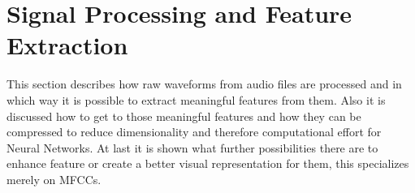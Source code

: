 
\section{Signal Processing and Feature Extraction}\label{sec:features}
This section describes how raw waveforms from audio files are processed and in which way it is possible to extract meaningful features from them.
Also it is discussed how to get to those meaningful features and how they can be compressed to reduce dimensionality and therefore computational effort for Neural Networks.
At last it is shown what further possibilities there are to enhance feature or create a better visual representation for them, this specializes merely on MFCCs.
